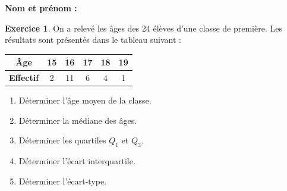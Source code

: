 \documentclass{article}
\theoremstyle{definition}
\newtheorem{exercice}{Exercice}
\begin{document}
\pagestyle{fancy}

\fancyhf{} %
\fancyhead[L]{\large \textbf{\Niveau}}
\fancyhead[C]{\large \textbf{\ChapitreCourt}}

\large

\textbf{Nom et prénom :}\enspace\dotfill

\vfill

\begin{exercice}
  On a relevé les âges des 24 élèves d’une classe de première. Les résultats sont présentés dans le tableau suivant :

  \begin{center}
    \renewcommand{\arraystretch}{1.5}
    \begin{tabular}{|c|c|c|c|c|c|}
      \hline
      \textbf{Âge}        & 15 & 16 & 17 & 18 & 19 \\
      \hline
      \textbf{Effectif}   &  2 & 11 &  6 &  4 &  1 \\
      \hline
    \end{tabular}
  \end{center}

  \begin{enumerate}
    \item Déterminer l’âge moyen de la classe.
    \item Déterminer la médiane des âges.
    \item Déterminer les quartiles $Q_1$ et $Q_3$.
    \item Déterminer l’écart interquartile.
    \item Déterminer l’écart-type.
  \end{enumerate}
\end{exercice}

\vfill
\end{document}
